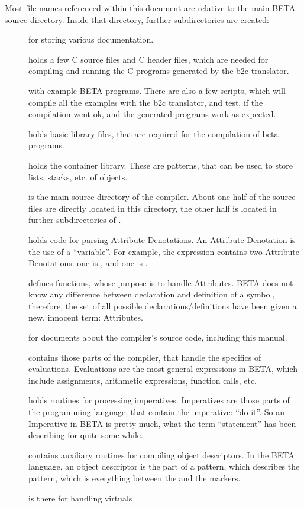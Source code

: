Most file names referenced within this document are relative
to the main BETA source directory.  Inside that directory,
further subdirectories are created:
\begin{description}
\item[] for storing various documentation.
\item[] holds a few C source files and C header files,
    which are needed for compiling and running the C programs
    generated by the b2c translator.
\item[] with example BETA programs.  There are also a
    few scripts, which will compile all the examples with the
    b2c translator, and test, if the compilation went ok, and
    the generated programs work as expected.
\item[] holds basic library files, that are required
    for the compilation of beta programs.
\item[] holds the container library.  These are
    patterns, that can be used to store lists, stacks, etc. of
    objects.
\item[] is the main source directory of the compiler.
    About one half of the source files are directly located in
    this directory, the other half is located in further
    subdirectories of .
\item[] holds code for parsing Attribute Denotations.
    An Attribute Denotation is the use of a ``variable''.  For
    example, the expression  contains two
    Attribute Denotations: one is , and one is .
\item[] defines functions, whose purpose is to
    handle Attributes.  BETA does not know any difference between
    declaration and definition of a symbol, therefore, the set
    of all possible declarations/definitions have been given
    a new, innocent term: Attributes.
\item[] for documents about the compiler's source
    code, including this manual.
\item[] contains those parts of the compiler, that
    handle the specifics of evaluations.  Evaluations are
    the most general expressions in BETA, which include
    assignments, arithmetic expressions, function calls, etc.
\item[] holds routines for processing imperatives.
    Imperatives are those parts of the programming language,
    that contain the imperative: ``do it''.  So an Imperative
    in BETA is pretty much, what the term ``statement'' has
    been describing for quite some while.
\item[] contains auxiliary routines for compiling
    object descriptors.  In the BETA language, an object
    descriptor is the part of a pattern, which describes the
    pattern, which is everything between the \cq{(\#} and the
    \cq{\#)} markers.
\item[] is there for handling virtuals
\end{description}
